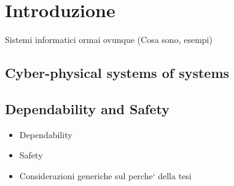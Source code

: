 \chapter{Introduzione}

Sistemi informatici ormai ovunque (Cosa sono, esempi)

\section{Cyber-physical systems of systems}

\section{Dependability and Safety}

\begin{itemize}
	\item Dependability
	\item Safety
	\item Considerazioni generiche sul perche` della tesi
\end{itemize}
